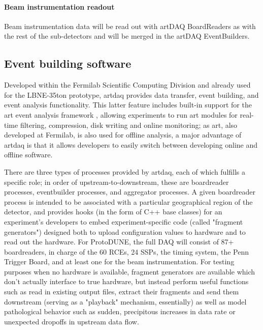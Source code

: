 
\paragraph{Beam instrumentation readout}

Beam instrumentation data will be read out with artDAQ BoardReaders as with 
the rest of the sub-detectors and will be merged in the artDAQ EventBuilders.

\subsection{Event building software }




Developed within the Fermilab Scientific Computing Division and
already used for the LBNE-35ton prototype, artdaq provides data
transfer, event building, and event analysis functionality. This
latter feature includes built-in support for the art event analysis
framework \cite{fnal:art}, allowing experiments to run art modules for real-time
filtering, compression, disk writing and online monitoring; as art,
also developed at Fermilab, is also used for offline analysis, a major
advantage of artdaq is that it allows developers to easily switch
between developing online and offline software.

There are three types of processes provided by artdaq, each of which
fulfills a specific role; in order of upstream-to-downstream, these
are boardreader processes, eventbuilder processes, and aggregator
processes. A given boardreader process is intended to be associated
with a particular geographical region of the detector, and provides
hooks (in the form of C++ base classes) for an experiment's developers
to embed experiment-specific code (called "fragment generators")
designed both to upload configuration values to hardware and to read
out the hardware. For ProtoDUNE, the full DAQ will consist of 87+ 
boardreaders, in charge of the 60 RCEs, 24 SSPs, the timing system, 
the Penn Trigger Board, and at least one for the beam instrumentation.
For testing purposes when
no hardware is available, fragment generators are available which
don't actually interface to true hardware, but instead perform useful
functions such as read in existing output files, extract their
fragments and send them downstream (serving as a "playback" mechanism,
essentially) as well as model pathological behavior such as sudden,
precipitous increases in data rate or unexpected dropoffs in upstream
data flow.

